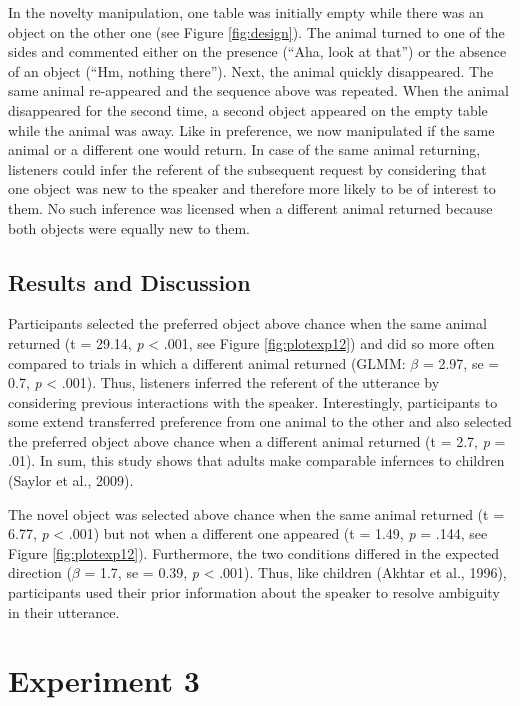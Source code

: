 \documentclass[10pt, letterpaper]{article}
\begin{document}
In the novelty manipulation, one table was initially empty while there
was an object on the other one (see Figure \ref{fig:design}). The animal
turned to one of the sides and commented either on the presence (``Aha,
look at that'') or the absence of an object (``Hm, nothing there'').
Next, the animal quickly disappeared. The same animal re-appeared and
the sequence above was repeated. When the animal disappeared for the
second time, a second object appeared on the empty table while the
animal was away. Like in preference, we now manipulated if the same
animal or a different one would return. In case of the same animal
returning, listeners could infer the referent of the subsequent request
by considering that one object was new to the speaker and therefore more
likely to be of interest to them. No such inference was licensed when a
different animal returned because both objects were equally new to them.

\subsection{Results and Discussion}\label{results-and-discussion-1}

Participants selected the preferred object above chance when the same
animal returned (t = 29.14, \emph{p} \textless{} .001, see Figure
\ref{fig:plotexp12}) and did so more often compared to trials in which a
different animal returned (GLMM: \(\beta\) = 2.97, se = 0.7, \emph{p}
\textless{} .001). Thus, listeners inferred the referent of the
utterance by considering previous interactions with the speaker.
Interestingly, participants to some extend transferred preference from
one animal to the other and also selected the preferred object above
chance when a different animal returned (t = 2.7, \emph{p} = .01). In
sum, this study shows that adults make comparable infernces to children
(Saylor et al., 2009).

The novel object was selected above chance when the same animal returned
(t = 6.77, \emph{p} \textless{} .001) but not when a different one
appeared (t = 1.49, \emph{p} = .144, see Figure \ref{fig:plotexp12}).
Furthermore, the two conditions differed in the expected direction
(\(\beta\) = 1.7, se = 0.39, \emph{p} \textless{} .001). Thus, like
children (Akhtar et al., 1996), participants used their prior
information about the speaker to resolve ambiguity in their utterance.

\section{Experiment 3}\label{experiment-3}
\end{document}
